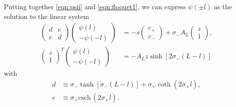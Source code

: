 \documentclass[a4paper,10pt]{article}
\newcommand{\sI}{\ensuremath{\sigma}}
\newcommand{\csch}{\mathrm{csch} \,}
\begin{document}
Putting together \eqref{eqn:psii} and \eqref{eqn:floquet1}, we can express $\psi(\pm l)$ as the solution to the linear system
% 
\begin{equation*}
	\begin{split}
	\begin{pmatrix} d&e\\e&d\end{pmatrix}
	\begin{pmatrix} \psi(l)\\ -\psi(-l)\end{pmatrix}
   &=
	-s\begin{pmatrix} c_+ \\ c_- \end{pmatrix}
	 +\sI_-A_L \begin{pmatrix}z\\1\end{pmatrix},\\
	\begin{pmatrix} z\\ 1\end{pmatrix}^T
  \begin{pmatrix} \psi(l)\\ -\psi(-l)\end{pmatrix} &= -A_Lz\sinh[2\sI_-(L-l)]
	\end{split}
\end{equation*}
% 
with 
% 
\[
\begin{split}
  d&\equiv \sI_-\tanh[\sI_-(L-l)] + \sI_+\coth(2\sI_+l),\\
  e&\equiv \sI_+\csch(2\sI_+l).
\end{split}
\]
% 
\end{document}

